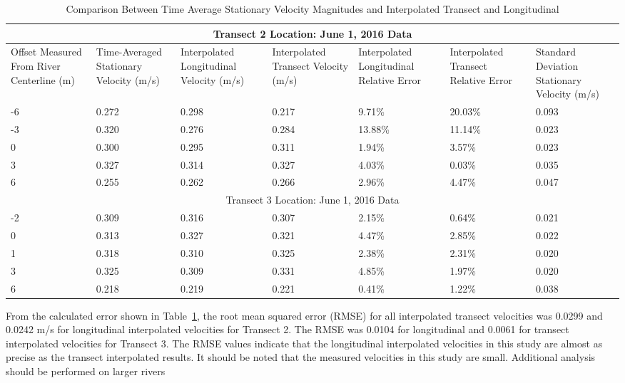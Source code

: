 \documentclass[Journal,letterpaper,BackFigs]{ascelike-new}
\begin{document}
\begin{table}
\caption{Comparison Between Time Average Stationary Velocity Magnitudes and Interpolated Transect and Longitudinal}
\label{table:VelocityErr}
\centering
\begin{tabular}{p{2.8cm}p{2cm}p{1.8cm}p{2cm}p{1.8cm}p{2cm}p{2cm}}
\hline\hline
\multicolumn{7}{c}{Transect 2 Location: June 1, 2016 Data} \\
\hline\hline
Offset Measured From River Centerline (m) &
Time-Averaged Stationary Velocity (m/s) &
Interpolated Longitudinal Velocity (m/s)  &
Interpolated Transect Velocity (m/s)  &
Interpolated Longitudinal Relative Error  &
Interpolated Transect Relative Error &
Standard Deviation Stationary Velocity (m/s) \\
\hline
-6	& 0.272	& 0.298 & 0.217 & 9.71\% & 20.03\% & 0.093\\
-3 & 0.320 & 0.276 & 0.284 & 13.88\% & 11.14\% & 0.023\\		
0 & 0.300 & 0.295 & 0.311 & 1.94\% & 3.57\% & 0.023\\		
3 & 0.327 & 0.314 & 0.327 & 4.03\% & 0.03\% & 0.035 \\		
6 &	0.255 & 0.262 & 0.266 & 2.96\% & 4.47\% & 0.047\\
\hline\hline
\multicolumn{7}{c}{Transect 3 Location: June 1, 2016 Data} \\
\hline\hline
-2  & 0.309 & 0.316 & 0.307 & 2.15\% & 0.64\% & 0.021 \\
0 & 0.313 &	0.327 & 0.321 &	4.47\% & 2.85\% & 0.022 \\
1 &	0.318 &	0.310 &	0.325 &	2.38\% & 2.31\% &	0.020 \\
3 &	0.325 &	0.309 &	0.331 &	4.85\% & 1.97\% &	0.020 \\
6 &	0.218 &	0.219 &	0.221 &	0.41\% & 1.22\% &	0.038 \\

\hline\hline
\end{tabular}
\end{table}

From the calculated error shown in Table~\ref{table:VelocityErr}, the root mean squared error (RMSE) for all interpolated transect velocities was 0.0299 and 0.0242 m/s for longitudinal interpolated velocities for Transect 2. The RMSE was 0.0104 for longitudinal and 0.0061 for transect interpolated velocities for Transect 3. The RMSE values indicate that the longitudinal interpolated velocities in this study are almost as precise as the transect interpolated results. It should be noted that the measured velocities in this study are small. Additional analysis should be performed on larger rivers
\end{document}
